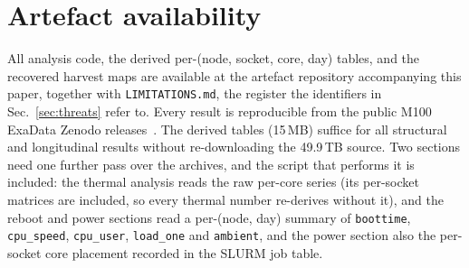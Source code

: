 \documentclass[10pt,conference]{IEEEtran}
\begin{document}
\section*{Artefact availability}
All analysis code, the derived per-(node, socket, core, day) tables, and the recovered harvest maps
are available at the artefact repository accompanying this paper, together with
\texttt{LIMITATIONS.md}, the register the identifiers in Sec.~\ref{sec:threats} refer to. Every
result is reproducible from the public M100 ExaData Zenodo releases~\cite{m100_zenodo}. The
derived tables (15\,MB) suffice for all structural and longitudinal results without re-downloading
the 49.9\,TB source. Two sections need one further pass over the archives, and the script that
performs it is included: the thermal analysis reads the raw per-core series (its per-socket
matrices are included, so every thermal number re-derives without it), and the reboot and
power sections read a per-(node, day) summary of \texttt{boottime}, \texttt{cpu\_speed},
\texttt{cpu\_user}, \texttt{load\_one} and \texttt{ambient}, and the power section also the
per-socket core placement recorded in the SLURM job table.



\end{document}
